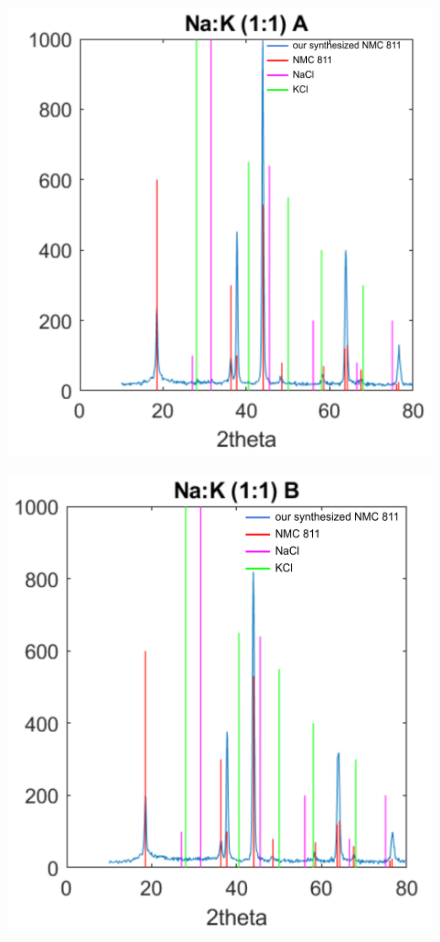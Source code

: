 \documentclass{article}
\begin{document}
\begin{figure}[H]
  \centering
  \begin{minipage}{0.48\textwidth}
    \centering
    \includegraphics[width=\textwidth]{XRD_A.png}
    \label{fig:output}
  \end{minipage}
  \hfill
  \begin{minipage}{0.48\textwidth}
    \centering
    \includegraphics[width=\textwidth]{XRD_B.png}

\end{minipage}
\end{figure}
\end{document}

